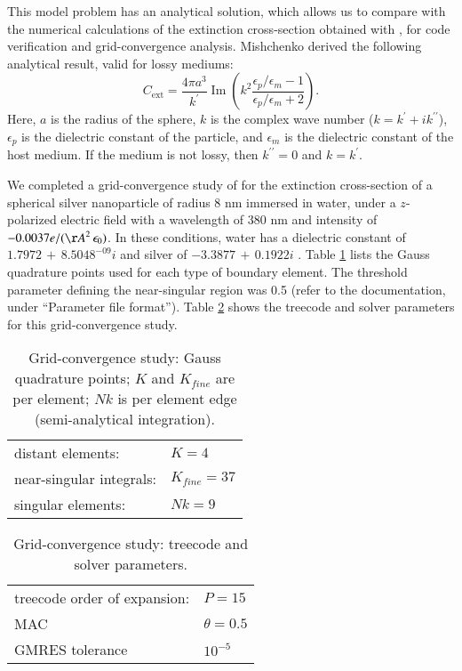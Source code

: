 This model problem has an analytical solution, which allows us to compare with
the numerical calculations of the extinction cross-section obtained with \pygbe,
for code verification and grid-convergence analysis.
Mishchenko \cite{Mishchenko2007} derived the following analytical result, 
valid for lossy mediums:
%
\begin{equation} 
    C_\text{ext} = \frac{4\pi a^3}{k^\prime} \operatorname{Im}\left(k^2 
                    \frac{\epsilon_p/\epsilon_m -1}{\epsilon_p/\epsilon_m +2}\right).
    \label{eq:an_sol}
\end{equation}
%
Here, $a$ is the radius of the sphere, $k$ is the complex wave number ($k=k^\prime +i k^{\prime\prime}$), $\epsilon_p$ 
is the dielectric constant of the particle, and $\epsilon_m$ is the dielectric constant
of the host medium. If the medium is not lossy, then $k^{\prime\prime}=0$ and $k=k^\prime$.

We completed a grid-convergence study of \pygbe for the extinction
cross-section of a spherical silver nanoparticle of radius 8 nm immersed in water,
under a $z$-polarized electric field with a wavelength of 380 nm and intensity of 
$-0.0037 e/({\AA}^2 \, \epsilon_0)$. In these conditions, water has a dielectric
constant of $1.7972 \, + \, 8.5048^{-09}i$ \cite{JohnsonChristy1972} and silver of
$-3.3877 \, + \, 0.1922i$ \cite{HaleQuerry1972}. 
Table \ref{table:quadparams1} lists the Gauss quadrature points used for each type of boundary element. 
The threshold parameter defining the near-singular region was 0.5 
(refer to the \pygbe documentation, under ``Parameter file format'').
Table \ref{table:treeparams1} shows the treecode and solver parameters for this grid-convergence study.

\begin{table}[h]
    \centering
    \caption{\label{table:quadparams1} Grid-convergence study: Gauss quadrature points; 
    $K$ and $K_{fine}$ are per element; $Nk $ is per element edge (semi-analytical integration). } 
    \begin{tabular}{l l}
    \hline%
     distant elements: & $K=4$ \\
     near-singular integrals:   & $ K_{fine}=37$ \\
     singular elements:  & $Nk =9$ \\
    \hline%
    \end{tabular}
\end{table}


\begin{table}[h]
    \centering
    \caption{\label{table:treeparams1} Grid-convergence study: treecode and solver parameters.} 
    \begin{tabular}{l l}
    \hline%
    treecode order of expansion: & $P=15$\\
    MAC                                         & $\theta=0.5$\\
    GMRES tolerance                    & $10^{-5}$\\
    \hline%
    \end{tabular}
\end{table}

